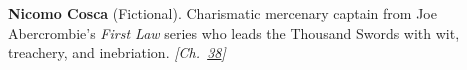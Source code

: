 \textbf{Nicomo Cosca} (Fictional). Charismatic mercenary captain from Joe Abercrombie's \emph{First Law} series who leads the Thousand Swords with wit, treachery, and inebriation. \emph{[Ch.~\hyperref[ch:christmastruce1914]{38}]}

